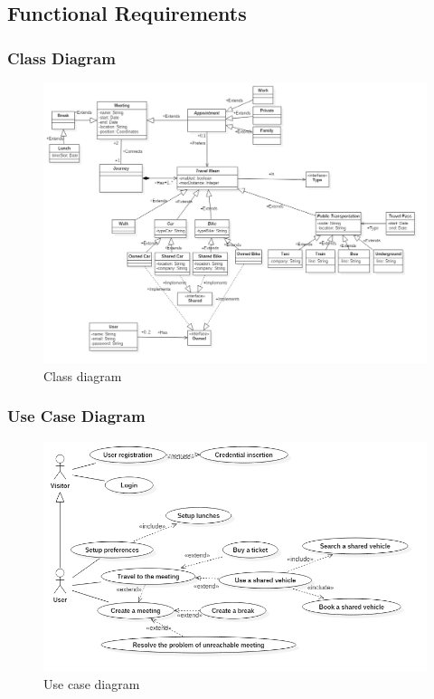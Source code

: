 \subsection{Functional Requirements}

\subsubsection{Class Diagram}

\begin{figure}[!htb]
\begin{minipage}[b]{0.4\textwidth}
	\centering
	\includegraphics[scale=0.4]{images/ClassDiagram}
	\caption{Class diagram}
	\label{ref:classdiagram}
\end{minipage}
\end{figure}

\subsubsection{Use Case Diagram}

\begin{figure}[!htb]
\begin{minipage}[b]{0.6\textwidth}
	\centering
	\includegraphics[scale=0.6]{images/UseCaseDiagram}
	\caption{Use case diagram}
	\label{ref:classdiagram}
\end{minipage}
\end{figure}

